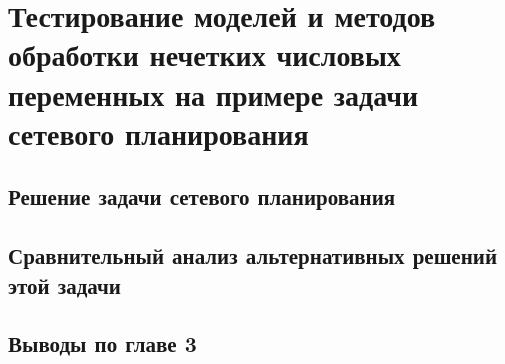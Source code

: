 \chapter{Тестирование моделей и методов обработки нечетких числовых переменных на примере задачи сетевого планирования}
\label{chapter3}

\section{Решение задачи сетевого планирования}
\label{chapter3_1}


\section{Сравнительный анализ альтернативных решений этой задачи} 
\label{chapter3_2}


\section{Выводы по главе 3} 
\label{chapter3_3}

